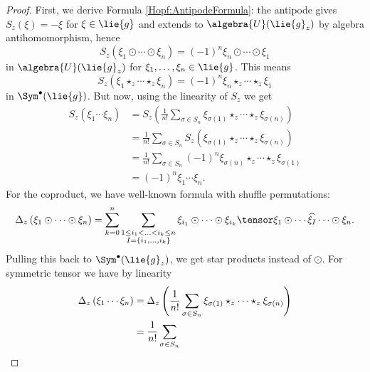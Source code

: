 \begin{proof}
	First, we derive Formula \ref{Hopf:AntipodeFormula}: the antipode gives
	$S_z(\xi) = - \xi$ for $\xi \in \lie{g}$ and extends to $\algebra{U}
	(\lie{g}_z)$ by algebra antihomomorphism, hence
	\begin{equation*}
		S_z \left( 
			\xi_1 \odot \cdots \odot \xi_n
		\right)
		=
		(-1)^n
		\xi_n \odot \cdots \odot \xi_1
	\end{equation*}
	in $\algebra{U}(\lie{g}_z)$ for $\xi_1, \ldots, \xi_n \in \lie{g}$.
	This means
	\begin{equation*}
		S_z \left( 
			\xi_1 \star_z \cdots \star_z \xi_n
		\right)
		=
		(-1)^n
		\xi_n \star_z \cdots \star_z \xi_1
	\end{equation*}	
	in $\Sym^{\bullet}(\lie{g})$. But now, using the linearity of $S_z$ 
	we get
	\begin{align*}
		S_z \left( \xi_1 \cdots \xi_n \right)
		& =
		S_z \left( 
		\frac{1}{n!}
			\sum\limits_{\sigma \in S_n}
			\xi_{\sigma(1)} 
			\star_z \cdots \star_z 
			\xi_{\sigma(n)}
		\right)
		\\
		& =
		\frac{1}{n!}
		\sum\limits_{\sigma \in S_n}
		S_z \left( 
			\xi_{\sigma(1)} 
			\star_z \cdots \star_z 
			\xi_{\sigma(n)}
		\right)
		\\
		& =
		\frac{1}{n!}
		\sum\limits_{\sigma \in S_n}
		(-1)^n
		\xi_{\sigma(n)} 
		\star_z \cdots \star_z 
		\xi_{\sigma(1)}
		\\
		& =
		(-1)^n
		\xi_1 \cdots \xi_n.
	\end{align*}
	For the coproduct, we have well-known formula with shuffle permutations:
	\begin{equation*}
		\ocoproduct_z \left(
			\xi_1 \odot \cdots \odot \xi_n
		\right)
		=
		\sum\limits_{k=0}^n
		\sum\limits_{\substack{
			1 \leq i_1
			< \ldots <
			i_k \leq n
			\\
			I = \{i_1, \ldots, i_k\}
		}}
		\xi_{i_1} \odot \cdots \odot \xi_{i_k}
		\tensor
		\xi_1 
		\odot \cdots 
		\widehat{\xi_I}
		\cdots \odot
		\xi_n.
	\end{equation*}
	Pulling this back to $\Sym^{\bullet}(\lie{g}_z)$, we get star products
	instead of $\odot$. For symmetric tensor we have by linearity
	\begin{align*}
		\ocoproduct_z \left( \xi_1 \cdots \xi_n \right)
		& =
		\ocoproduct_z \left( 
			\frac{1}{n!}
			\sum\limits_{\sigma \in S_n}
			\xi_{\sigma(1)} 
			\star_z \cdots \star_z 
			\xi_{\sigma(n)}
		\right)
		\\
		& =
		\frac{1}{n!}
		\sum\limits_{\sigma \in S_n}

\end{align*}
\end{proof}
